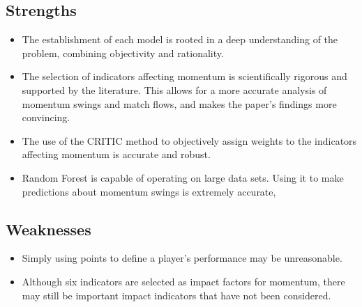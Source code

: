 \documentclass[12pt]{article}  %
\begin{document}
\subsection{Strengths}
\begin{itemize}
	\setlength{\parsep}{0ex} 
	\setlength{\topsep}{2ex} 
	\setlength{\itemsep}{1ex} 
	\item The establishment of each model is rooted in a deep understanding of the problem, combining objectivity and rationality.
	
	\item The selection of indicators affecting momentum is scientifically rigorous and supported by the literature. This allows for a more accurate analysis of momentum swings and match flows, and makes the paper's findings more convincing.
	
	\item The use of the CRITIC method to objectively assign weights to the indicators affecting momentum is accurate and robust.
	
	\item Random Forest is capable of operating on large data sets. Using it to make predictions about momentum swings is extremely accurate,
	
\end{itemize}



\subsection{Weaknesses}
\begin{itemize}
	\setlength{\parsep}{0ex} 
	\setlength{\topsep}{2ex} 
	\setlength{\itemsep}{1ex} 
	\item Simply using points to define a player's performance may be unreasonable.
	
	\item Although six indicators are selected as impact factors for momentum, there may still be important impact indicators that have not been considered. 
\end{itemize}

\clearpage
\end{document}
